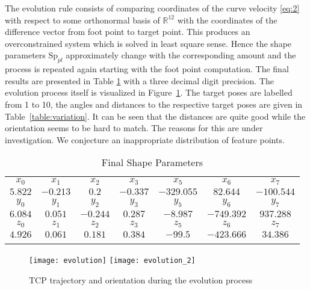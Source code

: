 \documentclass{scrartcl}
\newcommand{\Sp}{\text{Sp}}
\newcommand{\R}{\mathbb{R}}
\begin{document}
The evolution rule consists of comparing coordinates of the curve velocity
\eqref{eq:2} with respect to some orthonormal basis of $\R^{12}$ with the
coordinates of the difference vector from foot point to target point. This
produces an overconstrained system which is solved in least square sense. Hence
the shape parameters $\Sp_{pl}$ approximately change with the corresponding
amount and the process is repeated again starting with the foot point
computation. The final results are presented in Table \ref{table:rezulst} with a
three decimal digit precision. The evolution process itself is visualized in
Figure~\ref{fig:1}. The target poses are labelled from 1 to 10, the angles and
distances to the respective target poses are given in
Table~\ref{table:variation}. It can be seen that the distances are quite good
while the orientation seems to be hard to match. The reasons for this are under
investigation. We conjecture an inappropriate distribution of feature points.

\begin{table}
  \caption{Final Shape Parameters}
  \label{table:rezulst}
  \centering
  \begin{tabular}{ccccccc} 
    \midrule\noalign{\smallskip}
    $x_0$ & $x_1$ & $x_2$ & $x_3$ & $x_5$ & $x_6$ & $x_7$ \\
    $5.822$ & $-0.213$ & $0.2$ & $-0.337$ & $-329.055$ & $82.644$ & $-100.544$ \\
    \hline\noalign{\smallskip}
    $y_0$ & $y_1$ & $y_2$ & $y_3$ & $y_5$ & $y_6$ & $y_7$ \\
    $6.084$ & $0.051$ & $-0.244$ & $0.287$ & $-8.987$ & $-749.392$ & $937.288$ \\
    \hline\noalign{\smallskip}
    $z_0$ & $z_1$ & $z_2$ & $z_3$ & $z_5$ & $z_6$ & $z_7$ \\
    $4.926$ & $0.061$ & $0.181$ & $0.384$ & $-99.5$ & $-423.666$ & $34.386$ \\
    \midrule\noalign{\smallskip}
  \end{tabular}
\end{table}

\begin{figure}
 \texttt{[image: evolution]}\hfill
  \texttt{[image: evolution\_2]}
 \caption{TCP trajectory and orientation during the evolution process}
 \label{fig:1}
\end{figure}
\end{document}

